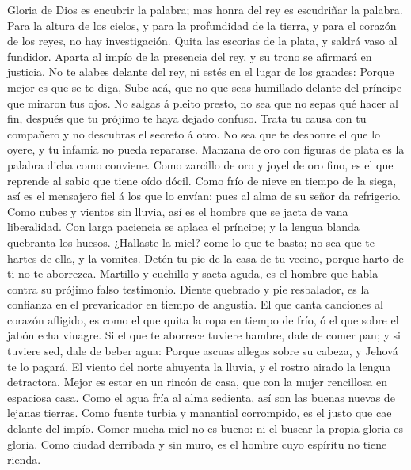  Gloria de Dios es encubrir la palabra; mas honra del rey es
escudriñar la palabra.  Para la altura de los cielos, y para
la profundidad de la tierra, y para el corazón de los reyes, no hay
investigación.  Quita las escorias de la plata, y saldrá
vaso al fundidor.  Aparta al impío de la presencia del rey,
y su trono se afirmará en justicia.  No te alabes delante
del rey, ni estés en el lugar de los grandes:  Porque mejor
es que se te diga, Sube acá, que no que seas humillado delante del
príncipe que miraron tus ojos.  No salgas á pleito presto,
no sea que no sepas qué hacer al fin, después que tu prójimo te haya
dejado confuso.  Trata tu causa con tu compañero y no
descubras el secreto á otro.  No sea que te deshonre el que
lo oyere, y tu infamia no pueda repararse.  Manzana de oro
con figuras de plata es la palabra dicha como conviene. 
Como zarcillo de oro y joyel de oro fino, es el que reprende al sabio
que tiene oído dócil.  Como frío de nieve en tiempo de la
siega, así es el mensajero fiel á los que lo envían: pues al alma de su
señor da refrigerio.  Como nubes y vientos sin lluvia, así
es el hombre que se jacta de vana liberalidad.  Con larga
paciencia se aplaca el príncipe; y la lengua blanda quebranta los
huesos.  ¿Hallaste la miel? come lo que te basta; no sea
que te hartes de ella, y la vomites.  Detén tu pie de la
casa de tu vecino, porque harto de ti no te aborrezca. 
Martillo y cuchillo y saeta aguda, es el hombre que habla contra su
prójimo falso testimonio.  Diente quebrado y pie
resbalador, es la confianza en el prevaricador en tiempo de angustia.
 El que canta canciones al corazón afligido, es como el que
quita la ropa en tiempo de frío, ó el que sobre el jabón echa vinagre.
 Si el que te aborrece tuviere hambre, dale de comer pan; y
si tuviere sed, dale de beber agua:  Porque ascuas allegas
sobre su cabeza, y Jehová te lo pagará.  El viento del
norte ahuyenta la lluvia, y el rostro airado la lengua detractora.
 Mejor es estar en un rincón de casa, que con la mujer
rencillosa en espaciosa casa.  Como el agua fría al alma
sedienta, así son las buenas nuevas de lejanas tierras. 
Como fuente turbia y manantial corrompido, es el justo que cae delante
del impío.  Comer mucha miel no es bueno: ni el buscar la
propia gloria es gloria.  Como ciudad derribada y sin muro,
es el hombre cuyo espíritu no tiene rienda.

